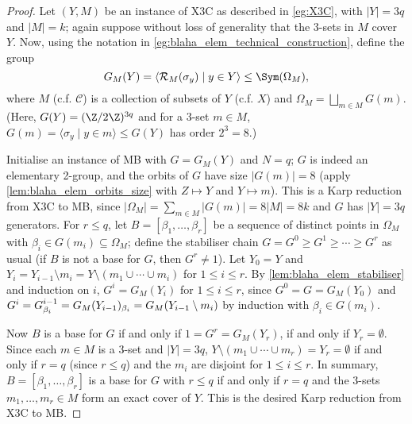 \begin{proof}
    Let $(Y,M)$ be an instance of X3C as described in \autoref{eg:X3C}, with $|Y| = 3q$ and $|M| = k$; again suppose without loss of generality that the 3-sets in $M$ cover $Y$. Now, using the notation in \autoref{eg:blaha_elem_technical_construction}, define the group
    $$G_M(Y) = \langle \mathcal{R}_M(\sigma_y) \mid y \in Y \rangle \leq \Sym(\Omega_M),$$ where $M$ (c.f. $\mathcal{C}$) is a collection of subsets of $Y$ (c.f. $X$) and $\Omega_M = \bigsqcup_{m \in M} G(m)$. (Here, $G(Y) = (\Z/2\Z)^{3q}$ and for a 3-set $m \in M$, $G(m) = \langle \sigma_y \mid y \in m \rangle \leq G(Y)$ has order $2^3 = 8$.)

    Initialise an instance of MB with $G = G_M(Y)$ and $N = q$; $G$ is indeed an elementary  2-group, and the orbits of $G$ have size $|G(m)| = 8$ (apply \autoref{lem:blaha_elem_orbits_size} with $Z \mapsto Y$ and $Y \mapsto m$). This is a Karp reduction from X3C to MB, since $|\Omega_M| = \sum_{m \in M} |G(m)| = 8|M| = 8k$ and $G$ has $|Y| = 3q$ generators. For $r \leq q$, let $B = [\beta_1,\dotsc,\beta_r]$ be a sequence of distinct points in $\Omega_M$ with $\beta_i \in G(m_i) \subseteq \Omega_M$; define the stabiliser chain $G = G^0 \geq G^1 \geq \dotsb \geq G^r$ as usual (if $B$ is not a base for $G$, then $G^r \neq 1$). Let $Y_0 = Y$ and $Y_i = Y_{i-1} \setminus m_i = Y \setminus (m_1 \cup \dotsb \cup m_i)$ for $1 \leq i \leq r$. By \autoref{lem:blaha_elem_stabiliser} and induction on $i$, $G^i = G_M(Y_i)$ for $1 \leq i \leq r$, since $G^0 = G = G_M(Y_0)$ and $G^i = \added{2}{G^{i-1}_{\beta_i}} = \added{2}{G_M(Y_{i-1})_{\beta_i}} = G_M(Y_{i-1} \setminus m_i)$ by induction with $\beta_i \in G(m_i)$.

    Now $B$ is a base for $G$ if and only if $1 = G^r = G_M(Y_r)$, if and only if $Y_r = \emptyset$. Since each $m \in M$ is a 3-set and $|Y| = 3q$, $Y \setminus (m_1 \cup \dotsb \cup m_r) = Y_r = \emptyset$ if and only if $r = q$ (since $r \leq q$) and the $m_i$ are disjoint for $1 \leq i \leq r$. In summary, $B = [\beta_1,\dotsc,\beta_r]$ is a base for $G$ with $r \leq q$ if and only if $r = q$ and the 3-sets $m_1,\dotsc,m_r \in M$ form an exact cover of $Y$. This is the desired Karp reduction from X3C to MB.
\end{proof}


